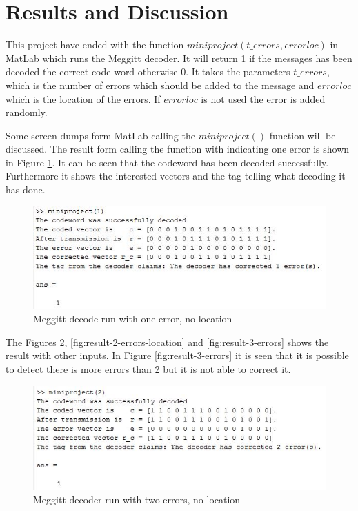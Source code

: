 \documentclass[Main]{subfiles}
\begin{document}
\section{Results and Discussion}
This project have ended with the function $miniproject(t\_errors, errorloc)$ in MatLab which runs the Meggitt decoder.
It will return 1 if the messages has been decoded the correct code word otherwise 0.
It takes the parameters $t\_errors$, which is the number of errors which should be added to the message and $errorloc$ which is the location of the errors.
If $errorloc$ is not used the error is added randomly.

Some screen dumps form MatLab calling the $miniproject()$ function will be discussed.
The result form calling the function with indicating one error is shown in Figure \ref{fig:result-1-errors}.
It can be seen that the codeword has been decoded successfully.
Furthermore it shows the interested vectors and the tag telling what decoding it has done. 

\begin{figure}[h!]
\centering
\includegraphics[width=0.7\linewidth]{./Picture/result-1-errors}
\caption{Meggitt decode run with one error, no location}
\label{fig:result-1-errors}
\end{figure}

The Figures \ref{fig:result-2-errors}, \ref{fig:result-2-errors-location} and \ref{fig:result-3-errors} shows the result with other inputs.
In Figure \ref{fig:result-3-errors} it is seen that it is possible to detect there is more errors than 2 but it is not able to correct it. 

\begin{figure}[h!]
\centering
\includegraphics[width=0.7\linewidth]{./Picture/result-2-errors}
\caption{Meggitt decoder run with two errors, no location}
\label{fig:result-2-errors}
\end{figure}
\end{document}
